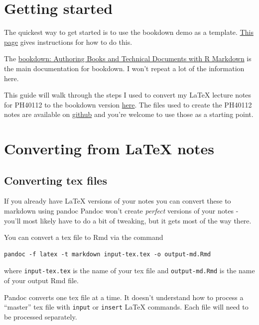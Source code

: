\documentclass[
]{book}
\begin{document}
\chapter{Getting started}\label{getting-started}

The quickest way to get started is to use the bookdown demo as a template. \href{https://bookdown.org/yihui/bookdown/get-started.html}{This page} gives instructions for how to do this.

The \href{https://bookdown.org/yihui/bookdown/}{bookdown: Authoring Books and Technical Documents with R Markdown} is the main documentation for bookdown. I won't repeat a lot of the information here.

This guide will walk through the steps I used to convert my LaTeX lecture notes for PH40112 to the bookdown version \href{https://vickyscowcroft.github.io/PH40112_rmd/}{here}. The files used to create the PH40112 notes are available on \href{https://github.com/vickyscowcroft/PH40112_rmd}{github} and you're welcome to use those as a starting point.

\chapter{Converting from LaTeX notes}\label{convert-latex}

\section{Converting tex files}\label{sec:con-tex}

If you already have LaTeX versions of your notes you can convert these to markdown using pandoc Pandoc won't create \emph{perfect} versions of your notes - you'll most likely have to do a bit of tweaking, but it gets most of the way there.

You can convert a tex file to Rmd via the command

\begin{verbatim}
pandoc -f latex -t markdown input-tex.tex -o output-md.Rmd
\end{verbatim}

where \texttt{input-tex.tex} is the name of your tex file and \texttt{output-md.Rmd} is the name of your output Rmd file.

Pandoc converts one tex file at a time. It doesn't understand how to process a ``master'' tex file with \texttt{input} or \texttt{insert} LaTeX commands. Each file will need to be processed separately.
\end{document}
